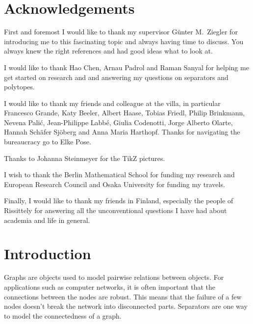 \documentclass[a4paper,12pt]{book}
\theoremstyle{plain}
\theoremstyle{definition}
\begin{document}
\cleardoublepage




\pagestyle{scrheadings}

\newcommand{\header}[1]{\markboth{}{\MakeUppercase{ #1}}}


\chapter*{Acknowledgements}
\header{Acknowledgements}

First and foremost I would like to thank my supervisor Günter M.\ Ziegler for introducing me to this fascinating topic and always having time to discuss. You always knew the right references and had good ideas what to look at.

I would like to thank Hao Chen, Arnau Padrol and Raman Sanyal for helping me get started on research and and answering my questions on separators and polytopes.

I would like to thank my friends and colleague at the villa, in particular Francesco Grande, Katy Beeler, Albert Haase, Tobias Friedl, Philip Brinkmann, Nevena Pali\'{c}, Jean-Philippe Labb\'e, Giulia Codenotti, Jorge Alberto Olarte, Hannah Schäfer Sjöberg and Anna Maria Harthopf. Thanks for navigating the bureaucracy go to Elke Pose.

Thanks to Johanna Steinmeyer for the TikZ pictures.

I wish to thank the Berlin Mathematical School for funding my research and European Research Council and Osaka University for funding my travels. 

Finally, I would like to thank my friends in Finland, especially the people of Rissittely for answering all the unconventional questions I have had about academia and life in general. 




\cleardoublepage

\tableofcontents

\cleardoublepage


\chapter{Introduction}
\label{intro}

Graphs are objects used to model pairwise relations between objects. For applications such as computer
networks, it is often important that the connections between the nodes are robust. This means that the failure of a few nodes doesn't 
break the network into disconnected parts. Separators are one way to model the connectedness of a graph. 
\end{document}
